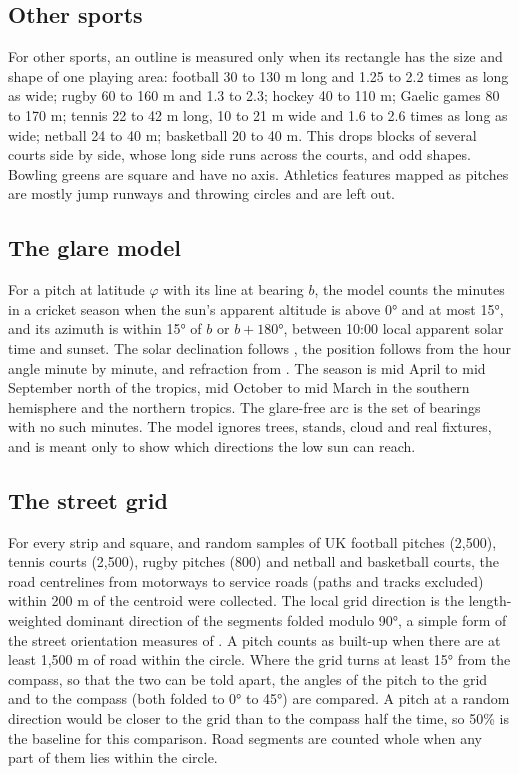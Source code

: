 \documentclass[11pt,a4paper]{article}
\begin{document}
\subsection{Other sports}
For other sports, an outline is measured only when its rectangle has the size and shape of one playing area: football 30 to 130 m long and 1.25 to 2.2 times as long as wide; rugby 60 to 160 m and 1.3 to 2.3; hockey 40 to 110 m; Gaelic games 80 to 170 m; tennis 22 to 42 m long, 10 to 21 m wide and 1.6 to 2.6 times as long as wide; netball 24 to 40 m; basketball 20 to 40 m. This drops blocks of several courts side by side, whose long side runs across the courts, and odd shapes. Bowling greens are square and have no axis. Athletics features mapped as pitches are mostly jump runways and throwing circles and are left out.

\subsection{The glare model}
For a pitch at latitude $\varphi$ with its line at bearing $b$, the model counts the minutes in a cricket season when the sun's apparent altitude is above 0° and at most 15°, and its azimuth is within 15° of $b$ or $b+180°$, between 10:00 local apparent solar time and sunset. The solar declination follows \citet{spencer}, the position follows from the hour angle minute by minute, and refraction from \citet{bennett}. The season is mid April to mid September north of the tropics, mid October to mid March in the southern hemisphere and the northern tropics. The glare-free arc is the set of bearings with no such minutes. The model ignores trees, stands, cloud and real fixtures, and is meant only to show which directions the low sun can reach.

\subsection{The street grid}
For every strip and square, and random samples of UK football pitches (2,500), tennis courts (2,500), rugby pitches (800) and netball and basketball courts, the road centrelines from motorways to service roads (paths and tracks excluded) within 200 m of the centroid were collected. The local grid direction is the length-weighted dominant direction of the segments folded modulo 90°, a simple form of the street orientation measures of \citet{boeing}. A pitch counts as built-up when there are at least 1,500 m of road within the circle. Where the grid turns at least 15° from the compass, so that the two can be told apart, the angles of the pitch to the grid and to the compass (both folded to 0° to 45°) are compared. A pitch at a random direction would be closer to the grid than to the compass half the time, so 50\% is the baseline for this comparison. Road segments are counted whole when any part of them lies within the circle.
\end{document}
